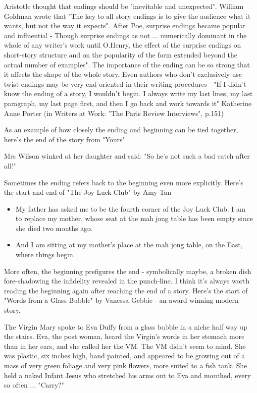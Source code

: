 \documentclass[11pt]{article}
\newenvironment{narrow}[2]{%
 \begin{list}{}{%
  \setlength{\topsep}{0pt}%
  \setlength{\leftmargin}{#1}%
  \setlength{\rightmargin}{#2}%
  \setlength{\listparindent}{\parindent}%
  \setlength{\itemindent}{\parindent}%
  \setlength{\parsep}{\parskip}%
 }%
\item[]}{\end{list}}
\begin{document}
Aristotle thought that endings should be "inevitable and unexpected". William Goldman wrote that "The key to all story endings is to give the audience what it wants, but not the way it expects".
After Poe, surprise endings became popular and influential - Though surprise endings as not ... numerically dominant in the whole of any writer's work until O.Henry, the effect of the surprise endings on short-story structure and on the popularity of the form extended beyond the actual number of examples". The importance of the ending can be so strong that it affects the shape of the whole story. Even authors who don't exclusively use twist-endings may be very end-oriented in their writing procedures - "If I didn't know the ending of a story, I wouldn't begin. I always write my last lines, my last paragraph, my last page first, and then I go back and work towards it" Katherine Anne Porter (in Writers at Work: "The Paris Review Interviews", p.151)




As an example of how closely the ending and beginning can be tied together, here's the end of the story from "Yours"

\begin{narrow}{1.0cm}{1.0cm}
Mrs Wilson winked at her daughter and said: "So he's not such a bad catch after all!"
\end{narrow}

Sometimes the ending refers back to the beginning even more explicitly. Here's the start and end of "The Joy Luck Club" by Amy Tan



\begin{itemize}
\item  My father has asked me to be the fourth corner of the Joy Luck Club. I am to replace my mother, whose seat at the mah jong table has been empty since she died two months ago.
\item And I am sitting at my mother's place at the mah jong table, on the East, where things begin.
\end{itemize}

More often, the beginning prefigures the end - symbolically maybe, a broken dish fore-shadowing the infidelity revealed in the punch-line. I think it's always worth reading the beginning again after reaching the end of a story. Here's the start of "Words from a Glass Bubble" by Vanessa Gebbie - an award winning modern story. 

\begin{narrow}{1.0cm}{1.0cm}
The Virgin Mary spoke to Eva Duffy from a glass bubble in a niche half way 
up the stairs. Eva, the post woman, heard the Virgin's words in her stomach 
more than in her ears, and she called her the VM. The VM didn't seem to mind. 
She was plastic, six inches high, hand painted, and appeared to be growing out 
of a mass of very green foliage and very pink flowers, more suited to a fish 
tank. She held a naked Infant Jesus who stretched his arms out to Eva and 
mouthed, every so often ... "Carry?"
\end{narrow}
\end{document}
